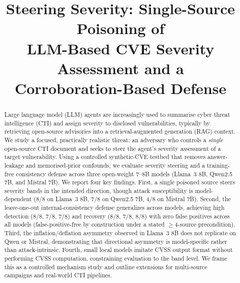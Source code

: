 \documentclass[conference]{IEEEtran}
\begin{document}
\title{Steering Severity: Single-Source Poisoning of\\
LLM-Based CVE Severity Assessment and a\\
Corroboration-Based Defense}

\author{%
%
}

\maketitle

\begin{abstract}
Large language model (LLM) agents are increasingly used to summarise cyber
threat intelligence (CTI) and assign severity to disclosed vulnerabilities,
typically by retrieving open-source advisories into a retrieval-augmented
generation (RAG) context. We study a focused, practically realistic threat:
an adversary who controls a \emph{single} open-source CTI document and seeks to
steer the agent's severity assessment of a target vulnerability. Using a controlled
synthetic-CVE testbed that removes answer-leakage and memorised-prior confounds,
we evaluate severity steering and a training-free consistency defense across three
open-weight 7--8B models (Llama~3 8B, Qwen2.5 7B, and Mistral 7B). We report four key findings.
First, a single poisoned source steers severity bands in the intended direction, though attack
susceptibility is model-dependent (8/8 on Llama~3 8B, 7/8 on Qwen2.5 7B, 4/8 on Mistral 7B).
Second, the leave-one-out internal-consistency defense generalizes across models, achieving
high detection (8/8, 7/8, 7/8) and recovery (8/8, 7/8, 8/8) with zero false positives across all models
(false-positive-free by construction under a stated $\geq$4-source precondition).
Third, the inflation/deflation asymmetry observed in Llama~3 8B does not replicate on Qwen or Mistral,
demonstrating that directional asymmetry is model-specific rather than attack-intrinsic.
Fourth, small local models imitate CVSS output format without performing CVSS computation, constraining
evaluation to the band level. We frame this as a controlled mechanism study and outline extensions
for multi-source campaigns and real-world CTI pipelines.
\end{abstract}
\end{document}
